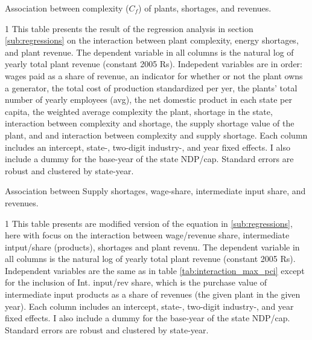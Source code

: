\documentclass[11pt]{article}
\begin{document}
\begin{sidewaystable}
	\begin{center}
		\begin{threeparttable}
		\caption{Association between complexity ($C_{f}$) of plants, shortages, and revenues.}
			\label{tab:interaction_avg_pci}
			
			\begin{tablenotes} \footnotesize
			\item[1] This table presents the result of the regression analysis in section \ref{sub:regressions} on the interaction between plant complexity, energy shortages, and plant revenue. The dependent variable in all columns is the natural log of yearly total plant revenue (constant 2005 Rs). Indepedent variables are in order: wages paid as a share of revenue, an indicator for whether or not the plant owns a generator, the total cost of production standardized per yer, the plants' total number of yearly employees (avg), the net domestic product in each state per capita, the weighted average complexity the plant, shortage in the state, interaction between complexity and shortage, the supply shortage value of the plant, and and interaction between complexity and supply shortage. Each column includes an intercept, state-, two-digit industry-, and year fixed effects. I also include a dummy for the base-year of the state NDP/cap. Standard errors are robust and clustered by state-year.
			\end{tablenotes}
		\end{threeparttable}
	\end{center}
\end{sidewaystable}

\begin{table}
	\begin{center}
		\begin{threeparttable}
		\caption{Association between Supply shortages, wage-share, intermediate input share, and revenues.}
			\label{tab:interaction_wage_input}
			
			\begin{tablenotes} \footnotesize
			\item[1] This table presents are modified version of the equation in \ref{sub:regressions}, here with focus on the interaction between wage/revenue share, intermediate intput/share (products), shortages and plant revenu. The dependent variable in all columns is the natural log of yearly total plant revenue (constant 2005 Rs). Independent variables are the same as in table \ref{tab:interaction_max_pci} except for the inclusion of Int. input/rev share, which is the purchase value of intermediate input products as a share of revenues (the given plant in the given year). Each column includes an intercept, state-, two-digit industry-, and year fixed effects. I also include a dummy for the base-year of the state NDP/cap. Standard errors are robust and clustered by state-year.
			\end{tablenotes}
		\end{threeparttable}
	\end{center}
\end{table}
\end{document}

